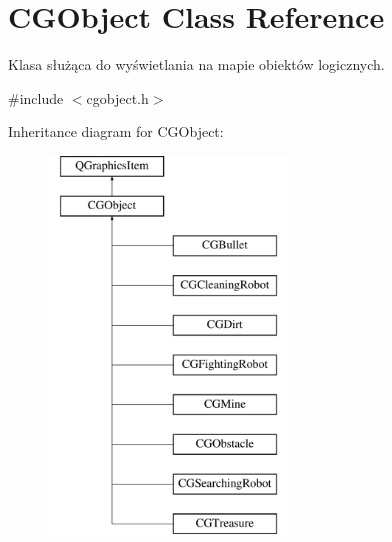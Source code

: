 \hypertarget{class_c_g_object}{}\section{C\+G\+Object Class Reference}
\label{class_c_g_object}


Klasa służąca do wyświetlania na mapie obiektów logicznych.  




{\ttfamily \#include $<$cgobject.\+h$>$}

Inheritance diagram for C\+G\+Object\+:\begin{figure}[H]
\begin{center}
\leavevmode
\includegraphics[height=10.000000cm]{class_c_g_object}
\end{center}
\end{figure}
